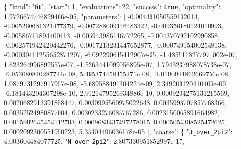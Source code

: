 \documentclass[
  10pt,
]{article}
\newenvironment{Shaded}{}{}
\newcommand{\DataTypeTok}[1]{\textcolor[rgb]{0.56,0.13,0.00}{#1}}
\newcommand{\DecValTok}[1]{\textcolor[rgb]{0.25,0.63,0.44}{#1}}
\newcommand{\FloatTok}[1]{\textcolor[rgb]{0.25,0.63,0.44}{#1}}
\newcommand{\FunctionTok}[1]{\textcolor[rgb]{0.02,0.16,0.49}{#1}}
\newcommand{\KeywordTok}[1]{\textcolor[rgb]{0.00,0.44,0.13}{\textbf{#1}}}
\newcommand{\OtherTok}[1]{\textcolor[rgb]{0.00,0.44,0.13}{#1}}
\newcommand{\StringTok}[1]{\textcolor[rgb]{0.25,0.44,0.63}{#1}}
\begin{document}
\begin{Shaded}
\begin{Highlighting}[]
\FunctionTok{\{}
  \DataTypeTok{"kind"}\FunctionTok{:} \StringTok{"fit"}\FunctionTok{,}
  \DataTypeTok{"start"}\FunctionTok{:} \DecValTok{1}\FunctionTok{,}
  \DataTypeTok{"evaluations"}\FunctionTok{:} \DecValTok{22}\FunctionTok{,}
  \DataTypeTok{"success"}\FunctionTok{:} \KeywordTok{true}\FunctionTok{,}
  \DataTypeTok{"optimality"}\FunctionTok{:} \FloatTok{1.9726674746829466e{-}05}\FunctionTok{,}
  \DataTypeTok{"parameters"}\FunctionTok{:} \OtherTok{[}
    \FloatTok{{-}0.004491050559192014}\OtherTok{,}
    \FloatTok{{-}0.005260681321477379}\OtherTok{,}
    \FloatTok{{-}0.007288009146483322}\OtherTok{,}
    \FloatTok{{-}0.009356180124010993}\OtherTok{,}
    \FloatTok{{-}0.00586717894400413}\OtherTok{,}
    \FloatTok{{-}0.005943986116772265}\OtherTok{,}
    \FloatTok{{-}0.004370792102990858}\OtherTok{,}
    \FloatTok{{-}0.002571942420442276}\OtherTok{,}
    \FloatTok{{-}0.0017213231447652877}\OtherTok{,}
    \FloatTok{{-}0.000749154002548138}\OtherTok{,}
    \FloatTok{{-}0.00030411255652871297}\OtherTok{,}
    \FloatTok{{-}6.092290615412907e{-}05}\OtherTok{,}
    \FloatTok{{-}1.4855118277971002e{-}07}\OtherTok{,}
    \FloatTok{1.623264996892557e{-}07}\OtherTok{,}
    \FloatTok{{-}1.5263441099056895e{-}07}\OtherTok{,}
    \FloatTok{1.7943237988078738e{-}07}\OtherTok{,}
    \FloatTok{{-}6.953080840287744e{-}08}\OtherTok{,}
    \FloatTok{5.495374458455271e{-}08}\OtherTok{,}
    \FloatTok{{-}3.0190924862669756e{-}08}\OtherTok{,}
    \FloatTok{1.0879731297917957e{-}08}\OtherTok{,}
    \FloatTok{{-}5.689588491304224e{-}09}\OtherTok{,}
    \FloatTok{2.349209120410406e{-}09}\OtherTok{,}
    \FloatTok{{-}6.181443204307298e{-}10}\OtherTok{,}
    \FloatTok{2.9121479526934886e{-}10}\OtherTok{,}
    \FloatTok{0.0009204275131215569}\OtherTok{,}
    \FloatTok{0.0020682913391858447}\OtherTok{,}
    \FloatTok{0.0030995560975022648}\OtherTok{,}
    \FloatTok{0.0035993707857768366}\OtherTok{,}
    \FloatTok{0.00352524980877004}\OtherTok{,}
    \FloatTok{0.0030233276085767286}\OtherTok{,}
    \FloatTok{0.0023150065891664982}\OtherTok{,}
    \FloatTok{0.0015902645454112703}\OtherTok{,}
    \FloatTok{0.0009683437497278015}\OtherTok{,}
    \FloatTok{0.0005054308525472625}\OtherTok{,}
    \FloatTok{0.0002092300551950223}\OtherTok{,}
    \FloatTok{5.33404496036178e{-}05}
  \OtherTok{]}\FunctionTok{,}
  \DataTypeTok{"coarse"}\FunctionTok{:} \FunctionTok{\{}
    \DataTypeTok{"\nolinkurl{J_over_2pi2}"}\FunctionTok{:} \FloatTok{4.003604484077725}\FunctionTok{,}
    \DataTypeTok{"\nolinkurl{N_over_2pi2}"}\FunctionTok{:} \FloatTok{2.807330951852997e{-}17}\FunctionTok{,}

\end{Highlighting}
\end{Shaded}
\end{document}
